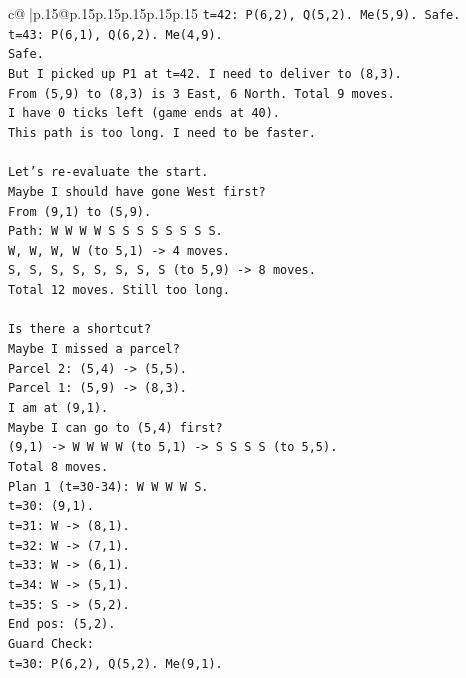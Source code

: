 \documentclass{article}
\begin{document}
{\begin{supertabular}{c@{$\;$}|p{.15\linewidth}@{}p{.15\linewidth}p{.15\linewidth}p{.15\linewidth}p{.15\linewidth}p{.15\linewidth}}
{{{\texttt{t=42: P(6,2), Q(5,2). Me(5,9). Safe.} \\
\texttt{t=43: P(6,1), Q(6,2). Me(4,9).} \\
\texttt{Safe.} \\
\texttt{But I picked up P1 at t=42. I need to deliver to (8,3).} \\
\texttt{From (5,9) to (8,3) is 3 East, 6 North. Total 9 moves.} \\
\texttt{I have 0 ticks left (game ends at 40).} \\
\texttt{This path is too long. I need to be faster.} \\
\\ 
\texttt{Let's re{-}evaluate the start.} \\
\texttt{Maybe I should have gone West first?} \\
\texttt{From (9,1) to (5,9).} \\
\texttt{Path: W W W W S S S S S S S S.} \\
\texttt{W, W, W, W (to 5,1) {-}> 4 moves.} \\
\texttt{S, S, S, S, S, S, S, S (to 5,9) {-}> 8 moves.} \\
\texttt{Total 12 moves. Still too long.} \\
\\ 
\texttt{Is there a shortcut?} \\
\texttt{Maybe I missed a parcel?} \\
\texttt{Parcel 2: (5,4) {-}> (5,5).} \\
\texttt{Parcel 1: (5,9) {-}> (8,3).} \\
\texttt{I am at (9,1).} \\
\texttt{Maybe I can go to (5,4) first?} \\
\texttt{(9,1) {-}> W W W W (to 5,1) {-}> S S S S (to 5,5).} \\
\texttt{Total 8 moves.} \\
\texttt{Plan 1 (t=30{-}34): W W W W S.} \\
\texttt{t=30: (9,1).} \\
\texttt{t=31: W {-}> (8,1).} \\
\texttt{t=32: W {-}> (7,1).} \\
\texttt{t=33: W {-}> (6,1).} \\
\texttt{t=34: W {-}> (5,1).} \\
\texttt{t=35: S {-}> (5,2).} \\
\texttt{End pos: (5,2).} \\
\texttt{Guard Check:} \\
\texttt{t=30: P(6,2), Q(5,2). Me(9,1).} \\
}}}
\end{supertabular}}
\end{document}
